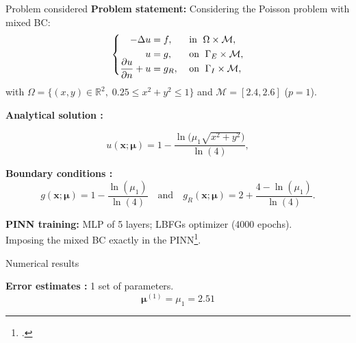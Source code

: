 \begin{frame}{Problem considered} 
	\textbf{Problem statement:} Considering the Poisson problem with mixed BC:
	\vspace{-5pt}
	\begin{equation*}
		\left\{
		\begin{aligned}
			-\Delta u & = f, \; &  & \text{in } \; \Omega \times \mathcal{M}, \\
			u         & = g, \;  &  & \text{on } \; \Gamma_E \times \mathcal{M}, \\
			\smash{\frac{\partial u}{\partial n}}+u  & = g_R, \;  &  & \text{on } \; \Gamma_I \times \mathcal{M},
		\end{aligned}
		\right.
	\end{equation*}

	with $\Omega=\{(x,y)\in\mathbb{R}^2, \; 0.25\le x^2+y^2\le 1\}$ and $\mathcal{M}=[2.4,2.6]$ ($p=1$).
		
	\vspace{8pt}
	\textbf{Analytical solution :}

	\vspace{-12pt}
	\begin{equation*}
		u(\bm{x};\bm{\mu})= 1 - \frac{\ln\big(\mu_1\sqrt{x^2+y^2}\big)}{\ln(4)},
	\end{equation*}
	\vspace{-5pt}
	
	\textbf{Boundary conditions :}
	\begin{equation*}
		g(\bm{x};\bm{\mu})=1 - \frac{\ln(\mu_1)}{\ln(4)} \quad \text{and} \quad g_R(\bm{x};\bm{\mu})=2 + \frac{4-\ln(\mu_1)}{\ln(4)}.
	\end{equation*}

	\vspace{2pt}
	\textbf{PINN training:} MLP of 5 layers; LBFGs optimizer (4000 epochs). \\
	Imposing the mixed BC exactly in the PINN\footcite{Sukumar_2022}.

	\vspace{8pt}
\end{frame}

\begin{frame}{Numerical results}
	\hspace{-5pt}\begin{minipage}[t]{0.46\linewidth}
		\textbf{Error estimates :} 1 set of parameters.
		$$\bm{\mu}^{(1)}=\mu_1=2.51 $$
		\vspace{-35pt}
		\begin{figure}[H]
		\end{figure}
	\end{minipage} \qquad \small
	\begin{minipage}[t]{0.48\linewidth}
	\end{minipage}
\end{frame}

